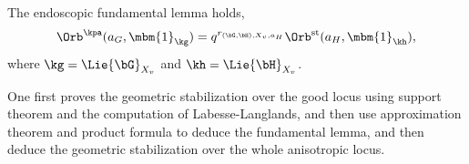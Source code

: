 \documentclass[a4paper, twoside]{article}
\begin{document}
\begin{thm}
	The endoscopic fundamental lemma holds,
	\[
		\Orb^{\kpa}(a_{G},\mbm{1}_{\kg})=q^{r_{(\bG,\bH),X_{v},a_{H}}}\Orb^{\text{st}}(a_{H},\mbm{1}_{\kh}),
	\]
	where $\kg=\Lie{\bG}_{X_{v}}$ and $\kh=\Lie{\bH}_{X_{v}}$.
\end{thm}

\begin{rmk}
	One first proves the geometric stabilization over the good locus using support theorem and the computation of Labesse-Langlands, and then use approximation theorem and product formula to deduce the fundamental lemma, and then deduce the geometric stabilization over the whole anisotropic locus.
\end{rmk}



\printref
\end{document}
